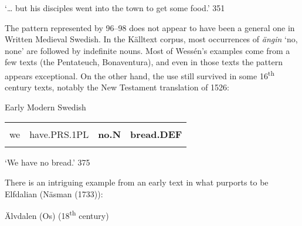 \begin{styleTranslation}
‘… but his disciples went into the town to get some food.’ 351

\end{styleTranslation}

\begin{styleBodyTextFirst}
The pattern represented by 96–98 does not appear to have been a general one in Written Medieval Swedish. In the Källtext corpus, most occurrences of \textit{ängin} ‘no, none’ are followed by indefinite nouns. Most of Wessén’s examples come from a few texts (the Pentateuch, Bonaventura), and even in those texts the pattern appears exceptional. On the other hand, the use still survived in some 16\textsuperscript{th} century texts, notably the New Testament translation of 1526:

\end{styleBodyTextFirst}

\begin{listWWNumileveli}
\item {}

\begin{styleExample}
Early Modern Swedish

\end{styleExample}

\end{listWWNumileveli}

\begin{tabular}{llll}
\lsptoprule
\multicolumn{4}{l}{Wij

}\\
we & have.PRS.1PL & {\bfseries no.N} & {\bfseries bread.DEF}\\
\lspbottomrule
\end{tabular}

\begin{styleTranslation}
‘We have no bread.’ 375

\end{styleTranslation}

\begin{styleBodyTextFirst}
There is an intriguing example from an early text in what purports to be Elfdalian (Näsman (1733)):

\end{styleBodyTextFirst}

\begin{listWWNumileveli}
\item {}

\begin{styleExample}
\label{bkm:Ref108604709}Älvdalen (Os) (18\textsuperscript{th} century)

\end{styleExample}

\end{listWWNumileveli}

